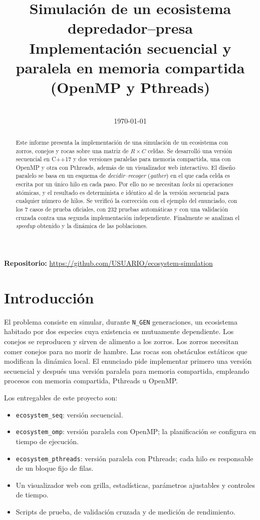 \documentclass[11pt,a4paper]{article}
\title{\textbf{Simulación de un ecosistema depredador--presa}\\[2pt]
  \large Implementación secuencial y paralela en memoria compartida (OpenMP y Pthreads)}
\author{\autores}
\date{\curso\\\today}
\newcommand{\repositorio}{\url{https://github.com/USUARIO/ecosystem-simulation}}
\begin{document}
\maketitle

\begin{abstract}
Este informe presenta la implementación de una simulación de un ecosistema con zorros, conejos y rocas
sobre una matriz de $R\times C$ celdas. Se desarrolló una versión secuencial en C++17 y dos versiones
paralelas para memoria compartida, una con OpenMP y otra con Pthreads, además de un visualizador web
interactivo. El diseño paralelo se basa en un esquema de \emph{decidir--recoger} (\emph{gather}) en el que
cada celda es escrita por un único hilo en cada paso. Por ello no se necesitan \emph{locks} ni operaciones
atómicas, y el resultado es determinista e idéntico al de la versión secuencial para cualquier número de
hilos. Se verificó la corrección con el ejemplo del enunciado, con los 7 casos de prueba oficiales, con 232
pruebas automáticas y con una
validación cruzada contra una segunda implementación independiente. Finalmente se analizan el
\emph{speedup} obtenido y la dinámica de las poblaciones.
\end{abstract}

\noindent\textbf{Repositorio:} \repositorio

\tableofcontents
\newpage

\section{Introducción}
El problema consiste en simular, durante \texttt{N\_GEN} generaciones, un ecosistema habitado por dos
especies cuya existencia es mutuamente dependiente. Los conejos se reproducen y sirven de alimento a los
zorros. Los zorros necesitan comer conejos para no morir de hambre. Las rocas son obstáculos estáticos que
modifican la dinámica local. El enunciado pide implementar primero una versión secuencial y después una
versión paralela para memoria compartida, empleando procesos con memoria compartida, Pthreads u OpenMP.

Los entregables de este proyecto son:
\begin{itemize}[nosep]
  \item \texttt{ecosystem\_seq}: versión secuencial.
  \item \texttt{ecosystem\_omp}: versión paralela con OpenMP; la planificación se configura en tiempo de ejecución.
  \item \texttt{ecosystem\_pthreads}: versión paralela con Pthreads; cada hilo es responsable de un bloque fijo de filas.
  \item Un visualizador web con grilla, estadísticas, parámetros ajustables y controles de tiempo.
  \item Scripts de prueba, de validación cruzada y de medición de rendimiento.
\end{itemize}
\end{document}
